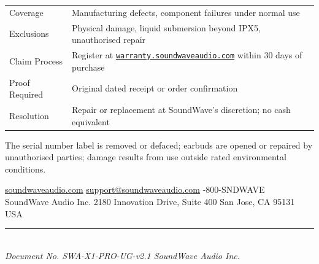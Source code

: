 \documentclass[11pt, a4paper]{article}
\begin{document}
\begin{tabularx}{\linewidth}{@{}K@{\hspace{8mm}}>{\raggedright\arraybackslash}X@{}}
\setlength{\parskip}{0pt}%
Coverage          & Manufacturing defects, component failures under normal use \\
Exclusions        & Physical damage, liquid submersion beyond IPX5, unauthorised repair \\
Claim Process     & Register at \href{https://warranty.soundwaveaudio.com}{\texttt{warranty.soundwaveaudio.com}} within 30 days of purchase \\
Proof Required    & Original dated receipt or order confirmation \\
Resolution        & Repair or replacement at SoundWave's discretion; no cash equivalent \\
\end{tabularx}

\vspace{6pt}

\begin{warningbox}[title={\faExclamationCircle\enspace\textbf{Warranty Void If}}]
  The serial number label is removed or defaced; earbuds are opened or repaired by
  unauthorised parties; damage results from use outside rated environmental conditions.
\end{warningbox}

\vspace{10pt}

\begin{center}
  \small\color{neutral}
  \faGlobeAmericas\enspace\href{https://soundwaveaudio.com}{soundwaveaudio.com}\quad
  \faEnvelope\enspace\href{mailto:support@soundwaveaudio.com}{support@soundwaveaudio.com}\quad
  \faPhone{}-800-SNDWAVE\\[4pt]
  SoundWave Audio Inc. \textperiodcentered{} 2180 Innovation Drive, Suite 400 \textperiodcentered{} San Jose, CA 95131 \textperiodcentered{} USA\\[6pt]
  \textcolor{rulecolor}{\rule{80mm}{0.4pt}}\\[4pt]
  \textit{Document No. SWA-X1-PRO-UG-v2.1 \textperiodcentered{} \faCopyright{} SoundWave Audio Inc.}
\end{center}
\end{document}
